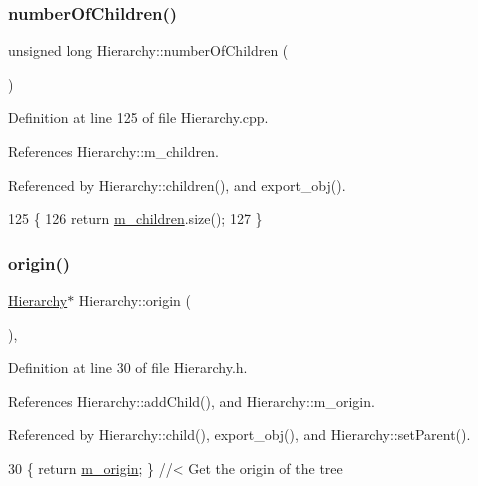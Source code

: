 \subsubsection{\texorpdfstring{number\+Of\+Children()}{numberOfChildren()}}
{\footnotesize\ttfamily unsigned long Hierarchy\+::number\+Of\+Children (\begin{DoxyParamCaption}{ }\end{DoxyParamCaption})\hspace{0.3cm}{\ttfamily [inherited]}}



Definition at line 125 of file Hierarchy.\+cpp.



References Hierarchy\+::m\+\_\+children.



Referenced by Hierarchy\+::children(), and export\+\_\+obj().


\begin{DoxyCode}
125                                            \{
126   \textcolor{keywordflow}{return} \hyperlink{classHierarchy_a038816763941fd4a930504917f60483b}{m\_children}.size();
127 \}
\end{DoxyCode}
\mbox{\label{classHierarchy_aee461dc930ce3871636ff87f075b1b83}} 
\subsubsection{\texorpdfstring{origin()}{origin()}}
{\footnotesize\ttfamily \hyperlink{classHierarchy}{Hierarchy}$\ast$ Hierarchy\+::origin (\begin{DoxyParamCaption}{ }\end{DoxyParamCaption})\hspace{0.3cm}{\ttfamily [inline]}, {\ttfamily [inherited]}}



Definition at line 30 of file Hierarchy.\+h.



References Hierarchy\+::add\+Child(), and Hierarchy\+::m\+\_\+origin.



Referenced by Hierarchy\+::child(), export\+\_\+obj(), and Hierarchy\+::set\+Parent().


\begin{DoxyCode}
30 \{ \textcolor{keywordflow}{return} \hyperlink{classHierarchy_a16c73e557d3a7c156ffb5dc4102d148e}{m\_origin}; \}  \textcolor{comment}{//< Get the origin of the tree}
\end{DoxyCode}
\mbox{\label{classHierarchy_a1c7bec8257e717f9c1465e06ebf845fc}} 
